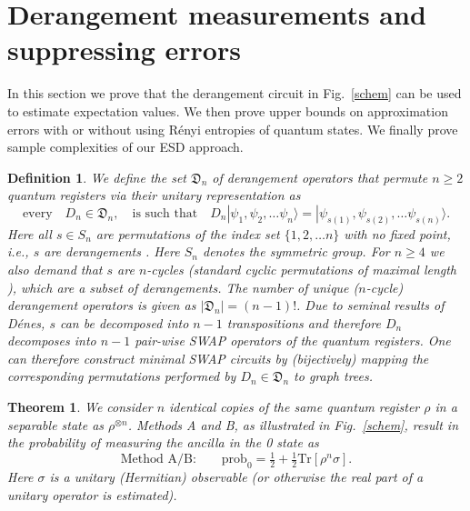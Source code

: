 \documentclass[aps,prx,showpacs,twocolumn,reprint]{revtex4-2}
\newtheorem{definition}{Definition}
\newtheorem{theorem}{Theorem}
\newcommand{\tr}{\mathrm{Tr}}
\newcommand{\perm}{D_n}
\begin{document}
{\section{Derangement measurements and suppressing errors}

In this section we prove that the derangement circuit in Fig.~\ref{schem}
can be used to estimate expectation values. We then prove upper bounds
on approximation errors with or without using R{\'e}nyi entropies of quantum states.
We finally prove sample complexities of our ESD approach.


\begin{definition}\label{derangement_def}
	We define the set $\mathfrak{D}_n$ of derangement operators that permute $n\geq 2$ quantum registers via
	their unitary representation as
	\begin{equation*}
	\text{every}  \quad \perm \in \mathfrak{D}_n,  \quad \text{is such that}
	\quad	\perm | \psi_1 , \psi_2 , \dots \psi_n \rangle = |\psi_{s(1)} , \psi_{s(2)}  , \dots \psi_{s(n)} \rangle.
	\end{equation*}
	Here all $s \in S_n$  are permutations of the index set $\{1,2,\dots n\}$
	with no fixed point, i.e., $s$ are derangements \cite{sagan2013symmetric,roberts2009applied}.
	Here $S_n$ denotes the symmetric group.
	For $n \geq 4$ we also
	demand that $s$ are $n$-cycles (standard cyclic permutations of maximal length \cite{sagan2013symmetric}), which are a subset of derangements.
	The number of unique ($n$-cycle) derangement operators is given as $|\mathfrak{D}_n| = (n-1)!$.
	Due to seminal results of D{\'e}nes, $s$ can be decomposed into $n-1$ transpositions \cite{denes1959representation}
	and therefore $\perm$ decomposes into $n-1$ pair-wise SWAP operators of the quantum registers.
	One can therefore construct minimal SWAP circuits by (bijectively) mapping the corresponding permutations
	performed by $\perm \in \mathfrak{D}_n$ to graph trees.
\end{definition}

\begin{theorem}	\label{theo1}
	We consider $n$ identical copies of the same quantum register $\rho$ in a separable state as $\rho^{\otimes n}$.
	Methods A and B, as illustrated in Fig.~\ref{schem}, result in the probability of
	measuring the ancilla in the 0 state as
	\begin{equation}
	\text{Method A/B:} \quad \quad \mathrm{prob}_0 = \tfrac{1}{2} + \tfrac{1}{2} \tr[\rho^n \sigma].
	\end{equation}
	Here $\sigma$ is a unitary (Hermitian) observable (or otherwise the real part of a unitary operator is estimated).
\end{theorem}




}
\end{document}

